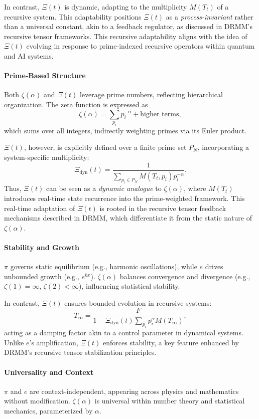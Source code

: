 \documentclass{article}
\theoremstyle{plain}
\begin{document}
\begin{itemize}
In contrast, \(\Xi(t) \) is dynamic, adapting to the multiplicity \( M(T_t) \) of a recursive system. This adaptability positions \(\Xi(t) \) as a \textit{process-invariant} rather than a universal constant, akin to a feedback regulator, as discussed in DRMM's recursive tensor frameworks. This recursive adaptability aligns with the idea of \(\Xi(t) \) evolving in response to prime-indexed recursive operators within quantum and AI systems.

\paragraph{Prime-Based Structure}
Both \( \zeta(\alpha) \) and \(\Xi(t) \) leverage prime numbers, reflecting hierarchical organization. The zeta function is expressed as
\[
\zeta(\alpha) = \sum_{p_i} p_i^{-\alpha} + \text{higher terms},
\]
which sums over all integers, indirectly weighting primes via its Euler product.

\(\Xi(t) \), however, is explicitly defined over a finite prime set \(P_N\), incorporating a system-specific multiplicity:
\[
\Xi_{\text{dyn}}(t) = \frac{1}{\sum_{p_i \in P_N} M(T_t, p_i) p_i^{-\alpha}}.
\]
Thus, \(\Xi(t) \) can be seen as a \textit{dynamic analogue} to \( \zeta(\alpha) \), where \(M(T_t)\) introduces real-time state recurrence into the prime-weighted framework. This real-time adaptation of \(\Xi(t) \) is rooted in the recursive tensor feedback mechanisms described in DRMM, which differentiate it from the static nature of \( \zeta(\alpha) \).

\paragraph{Stability and Growth}
\(\pi\) governs static equilibrium (e.g., harmonic oscillations), while \(e\) drives unbounded growth (e.g., \(e^{kx}\)). \( \zeta(\alpha) \) balances convergence and divergence (e.g., \( \zeta(1) = \infty \), \( \zeta(2) < \infty \)), influencing statistical stability.

In contrast, \(\Xi(t) \) ensures bounded evolution in recursive systems:
\[
T_\infty = \frac{F}{1 - \Xi_{\text{dyn}}(t) \sum_{p_i} p_i^\alpha M(T_\infty)},
\]
acting as a damping factor akin to a control parameter in dynamical systems. Unlike \(e\)'s amplification, \(\Xi(t) \) enforces stability, a key feature enhanced by DRMM's recursive tensor stabilization principles.

\paragraph{Universality and Context}
\(\pi\) and \(e\) are context-independent, appearing across physics and mathematics without modification. \(\zeta(\alpha)\) is universal within number theory and statistical mechanics, parameterized by \( \alpha \).


\end{itemize}
\end{document}
